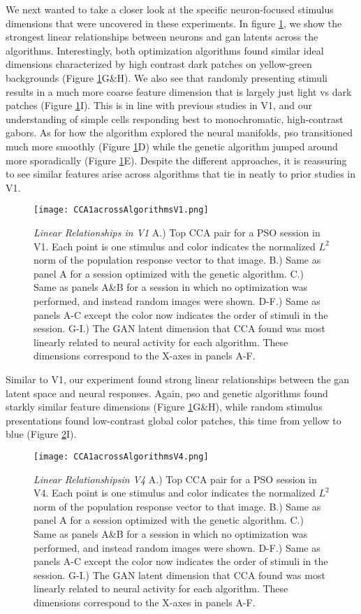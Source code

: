 We next wanted to take a closer look at the specific neuron-focused stimulus dimensions that were uncovered in these experiments. In figure \ref{fig:cca1V1}, we show the strongest linear relationships between neurons and \gls{gan} latents across the algorithms. Interestingly, both optimization algorithms found similar ideal dimensions characterized by high contrast dark patches on yellow-green backgrounds (Figure \ref{fig:cca1V1}G\&H). We also see that randomly presenting stimuli results in a much more coarse feature dimension that is largely just light vs dark patches (Figure \ref{fig:cca1V1}I). This is in line with previous studies in V1, and our understanding of simple cells responding best to monochromatic, high-contrast gabors. As for how the algorithm explored the neural manifolds, \gls{pso} transitioned much more smoothly (Figure \ref{fig:cca1V1}D) while the genetic algorithm jumped around more sporadically (Figure \ref{fig:cca1V1}E). Despite the different approaches, it is reassuring to see similar features arise across algorithms that tie in neatly to prior studies in V1.

\begin{figure}
	\centering
	\texttt{[image: CCA1acrossAlgorithmsV1.png]}
	{\caption{{\it Linear Relationships in V1} A.) Top CCA pair for a PSO session in V1. Each point is one stimulus and color indicates the normalized $L^2$ norm of the population response vector to that image. B.) Same as panel A for a session optimized with the genetic algorithm. C.) Same as panels A\&B for a session in which no optimization was performed, and instead random images were shown. D-F.) Same as panels A-C except the color now indicates the order of stimuli in the session. G-I.) The GAN latent dimension that CCA found was most linearly related to neural activity for each algorithm. These dimensions correspond to the X-axes in panels A-F.}
	\label{fig:cca1V1}}
\end{figure}

Similar to V1, our experiment found strong linear relationships between the \gls{gan} latent space and neural responses. Again, \gls{pso} and genetic algorithms found starkly similar feature dimensions (Figure \ref{fig:cca1V1}G\&H), while random stimulus presentations found low-contrast global color patches, this time from yellow to blue (Figure \ref{fig:cca1V4}I).

\begin{figure}
	\centering
	\texttt{[image: CCA1acrossAlgorithmsV4.png]}
	{\caption{{\it Linear Relationshipsin V4} A.) Top CCA pair for a PSO session in V4. Each point is one stimulus and color indicates the normalized $L^2$ norm of the population response vector to that image. B.) Same as panel A for a session optimized with the genetic algorithm. C.) Same as panels A\&B for a session in which no optimization was performed, and instead random images were shown. D-F.) Same as panels A-C except the color now indicates the order of stimuli in the session. G-I.) The GAN latent dimension that CCA found was most linearly related to neural activity for each algorithm. These dimensions correspond to the X-axes in panels A-F.}
	\label{fig:cca1V4}}
\end{figure}




